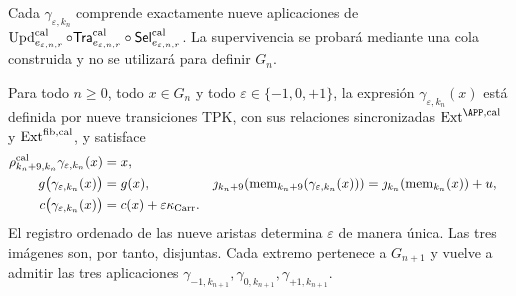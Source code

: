 Cada \(\gamma_{\varepsilon,k_n}\) comprende exactamente nueve aplicaciones
de \(\operatorname{Upd}^{\rm cal}_{e_{\varepsilon,n,r}}\circ
\mathsf{Tra}^{\rm cal}_{e_{\varepsilon,n,r}}\circ
\mathsf{Sel}^{\rm cal}_{e_{\varepsilon,n,r}}\). La
supervivencia se probará mediante una cola construida y no se utilizará para
definir \(G_n\).

\begin{lemma}
\label{lem:elevacion-catalogal-nonadica}
Para todo \(n\ge0\), todo \(x\in G_n\) y todo
\(\varepsilon\in\{-1,0,+1\}\), la expresión
\(\gamma_{\varepsilon,k_n}(x)\) está definida por nueve transiciones TPK,
con sus relaciones sincronizadas
\(\operatorname{Ext}^{\APP,\rm cal}\) y
\(\operatorname{Ext}^{\rm fib,cal}\), y satisface
\begin{align}
 \rho^{\rm cal}_{k_n+9,k_n}\gamma_{\varepsilon,k_n}(x)&=x,
 \label{eq:truncamiento-injerto-ch}\\
 g\bigl(\gamma_{\varepsilon,k_n}(x)\bigr)
   &=g(x),&
 \jmath_{k_n+9}\!\left(\operatorname{mem}_{k_n+9}
        (\gamma_{\varepsilon,k_n}(x))\right)
   &=\jmath_{k_n}\!\left(\operatorname{mem}_{k_n}(x)\right)+u,
 \label{eq:fase-memoria-injerto-ch}\\
 c\bigl(\gamma_{\varepsilon,k_n}(x)\bigr)
   &=c(x)+\varepsilon\kappa_{\rm Carr}.&&
 \label{eq:carry-injerto-ch}
\end{align}
\label{eq:tres-vueltas-propiedades-ch}
\label{eq:tres-vueltas-acarreo-ch}
El registro ordenado de las nueve aristas determina \(\varepsilon\) de manera única.
Las tres imágenes son, por tanto, disjuntas. Cada extremo pertenece a
\(G_{n+1}\) y vuelve a admitir las tres aplicaciones
\(\gamma_{-1,k_{n+1}},\gamma_{0,k_{n+1}},
\gamma_{+1,k_{n+1}}\).
\end{lemma}

